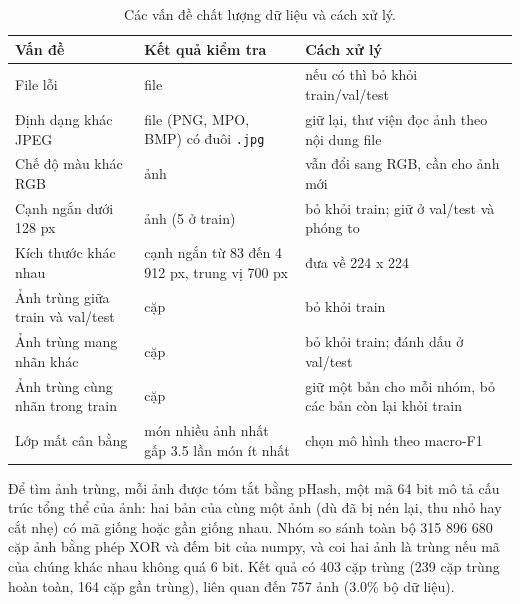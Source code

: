 \begin{table}[H]\centering
\caption{Các vấn đề chất lượng dữ liệu và cách xử lý.}\label{tab:img-quality}
\begin{tabular}{>{\raggedright\arraybackslash}p{4.4cm}>{\raggedright\arraybackslash}p{4.6cm}>{\raggedright\arraybackslash}p{5.2cm}}
\toprule
Vấn đề & Kết quả kiểm tra & Cách xử lý \\
\midrule
File lỗi & 0 file & nếu có thì bỏ khỏi train/val/test \\
Định dạng khác JPEG & 129 file (PNG, MPO, BMP) có đuôi \texttt{.jpg} & giữ lại, thư viện đọc ảnh theo nội dung file \\
Chế độ màu khác RGB & 0 ảnh & vẫn đổi sang RGB, cần cho ảnh mới \\
Cạnh ngắn dưới 128 px & 9 ảnh (5 ở train) & bỏ khỏi train; giữ ở val/test và phóng to \\
Kích thước khác nhau & cạnh ngắn từ 83 đến 4 912 px, trung vị 700 px & đưa về 224 x 224 \\
Ảnh trùng giữa train và val/test & 186 cặp & bỏ khỏi train \\
Ảnh trùng mang nhãn khác & 65 cặp & bỏ khỏi train; đánh dấu ở val/test \\
Ảnh trùng cùng nhãn trong train & 153 cặp & giữ một bản cho mỗi nhóm, bỏ các bản còn lại khỏi train \\
Lớp mất cân bằng & món nhiều ảnh nhất gấp 3.5 lần món ít nhất & chọn mô hình theo macro-F1 \\
\bottomrule
\end{tabular}
\end{table}


Để tìm ảnh trùng, mỗi ảnh được tóm tắt bằng pHash, một mã 64 bit mô tả cấu trúc tổng thể của ảnh: hai bản của cùng một
ảnh (dù đã bị nén lại, thu nhỏ hay cắt nhẹ) có mã giống hoặc gần giống nhau. Nhóm so sánh toàn bộ 315 896 680 cặp ảnh
bằng phép XOR và đếm bit của numpy, và coi hai ảnh là trùng nếu mã của chúng khác nhau không quá 6 bit. Kết quả có 403
cặp trùng (239 cặp trùng hoàn toàn, 164 cặp gần trùng), liên quan đến 757 ảnh (3.0\% bộ dữ liệu).


